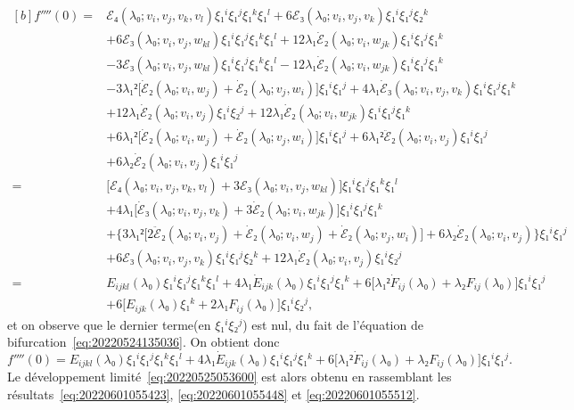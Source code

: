 \documentclass[12pt, final]{scrartcl}
\theoremstyle{definition}
\begin{document}
\begin{equation*}
  \begin{aligned}[b]
    f''''(0)
    ={} & ℰ₄(λ₀; v_i, v_j, v_k , v_l) ξ₁^i ξ₁^j ξ₁^k ξ₁^l + 6ℰ₃(λ₀; v_i, v_j, v_k) ξ₁^i ξ₁^j ξ₂^k\\
    & + 6ℰ₃(λ₀; v_i, v_j, w_{k l}) ξ₁^i ξ₁^j ξ₁^k ξ₁^l + 12 λ₁ \dot{ℰ}₂ (λ₀; v_{i }, w_{j k}) ξ₁^i ξ₁^j ξ₁^k\\
    & - 3ℰ₃(λ₀; v_i, v_j, w_{k l}) ξ₁^i ξ₁^j ξ₁^k ξ₁^l - 12 λ₁ \dot{ℰ}₂ (λ₀; v_i, w_{j k}) ξ₁^i ξ₁^j ξ₁^k\\
    & - 3 λ₁² \bigl[\dot{ℰ}₂(λ₀; v_i, w_j) + \dot{ℰ}₂(λ₀; v_j, w_i)\bigr] ξ₁^i ξ₁^j + 4 λ₁ \dot{ℰ}₃(λ₀; v_i, v_j, v_k) ξ₁^i ξ₁^j ξ₁^k\\
    & + 12 λ₁ \dot{ℰ}₂(λ₀; v_i, v_j) ξ₁^i ξ₂^j + 12 λ₁ \dot{ℰ}₂(λ₀ ; v_i, w_{j k}) ξ₁^i ξ₁^j ξ₁^k\\
    & + 6 λ₁² \bigl[\dot{ℰ}₂(λ₀; v_i, w_j) + \dot{ℰ}₂(λ₀; v_j, w_i)\bigr] ξ₁^i ξ₁^j + 6 λ₁² \ddot{ℰ}₂(λ₀; v_i, v_j) ξ₁^i ξ₁^j\\
    & + 6 λ₂ \dot{ℰ}₂(λ₀; v_i, v_j) ξ₁^i ξ₁^j\\
    ={} & \bigl[ ℰ₄(λ₀; v_i, v_j, v_k , v_l) + 3ℰ₃(λ₀; v_i, v_j, w_{k l}) \bigr] ξ₁^i ξ₁^j ξ₁^k ξ₁^l\\
    & + 4 λ₁ \bigl[\dot{ℰ}₃(λ₀; v_i, v_j, v_k) + 3 \dot{ℰ}₂(λ₀; v_i, w_{j k})\bigr] ξ₁^i ξ₁^j ξ₁^k\\
    & + \bigl\{ 3 λ₁² \bigl[2 \ddot{ℰ}₂ (λ₀; v_i, v_j) + \dot{ℰ}₂(λ₀; v_i, w_j) + \dot{ℰ}₂(λ₀; v_j, w_i)\bigr] + 6 λ₂ \dot{ℰ}₂(λ₀; v_i, v_j) \bigr\} ξ₁^i ξ₁^j\\
    & + 6ℰ₃(λ₀; v_i, v_j, v_k) ξ₁^i ξ₁^j ξ₂^k + 12 λ₁ \dot{ℰ}₂(λ₀; v_i, v_j) ξ₁^i ξ₂^j\\
    ={} & E_{i j k l}(λ₀) ξ₁^i ξ₁^j ξ₁^k ξ₁^l + 4 λ₁ \dot{E}_{i j k} (λ₀) ξ₁^i ξ₁^j ξ₁^k + 6 \bigl[λ₁² \dot{F}_{i j}(λ₀) + λ₂ F_{i j}(λ₀)\bigr] ξ₁^i ξ₁^j\\
    & + 6 \bigl[E_{i j k}(λ₀) ξ₁^k + 2 λ₁ F_{i j}(λ₀)\bigr] ξ₁^i ξ₂^j,
  \end{aligned}
\end{equation*}
et on observe que le dernier terme(en \(ξ₁^i ξ₂^j\)) est nul, du fait de
l'équation de bifurcation~\eqref{eq:20220524135036}. On obtient donc
\begin{equation}
  \label{eq:20220601055512}
  f''''(0) = E_{i j k l}(λ₀) ξ₁^i ξ₁^j ξ₁^k ξ₁^l + 4 λ₁ \dot{E}_{i j k}(λ₀) ξ₁^i ξ₁^j ξ₁^k + 6 \bigl[λ₁² \dot{F}_{i j}(λ₀) + λ₂ F_{i j}(λ₀)\bigr] ξ₁^i ξ₁^j .
\end{equation}
Le développement limité~\eqref{eq:20220525053600} est alors obtenu en
rassemblant les résultats~\eqref{eq:20220601055423}, \eqref{eq:20220601055448}
et \eqref{eq:20220601055512}.
\end{document}
